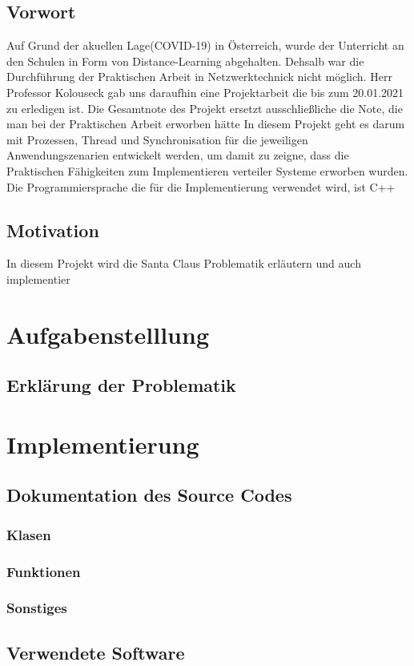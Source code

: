 \documentclass[a4paper,12pt]{exam}
\begin{document}
\subsection{Vorwort}
Auf Grund der akuellen Lage(COVID-19) in Österreich, wurde der Unterricht an den Schulen
in Form von Distance-Learning abgehalten. Dehsalb war die Durchführung der Praktischen Arbeit in
Netzwerktechnick nicht möglich. Herr Professor Kolouseck gab uns daraufhin eine Projektarbeit die bis zum 
20.01.2021 zu erledigen ist. Die Gesamtnote des Projekt ersetzt ausschließliche die Note,
die man bei der Praktischen Arbeit erworben hätte In diesem Projekt geht es darum mit Prozessen, Thread und Synchronisation
für die jeweiligen Anwendungszenarien entwickelt werden, um damit zu zeigne, dass die Praktischen
Fähigkeiten zum Implementieren verteiler Systeme erworben wurden. Die Programmiersprache die für
die Implementierung verwendet wird, ist C++

\subsection{Motivation}
In diesem Projekt wird die Santa Claus Problematik erläutern und auch implementier



\newpage

\section{Aufgabenstelllung}
\subsection{Erklärung der Problematik}

\section{Implementierung}

\subsection{Dokumentation des Source Codes}
\subsubsection{Klasen}
\subsubsection{Funktionen}
\subsubsection{Sonstiges}

\subsection{Verwendete Software}


\begin{verbatim}
\end{verbatim}
\end{document}
